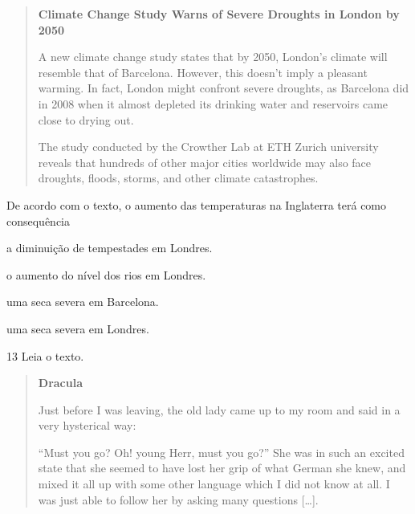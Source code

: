 \begin{quote}
\textbf{Climate Change Study Warns of Severe Droughts in London by 2050}

A new climate change study states that by 2050, London's climate will
resemble that of Barcelona. However, this doesn't imply a pleasant
warming. In fact, London might confront severe droughts, as Barcelona
did in 2008 when it almost depleted its drinking water and reservoirs
came close to drying out.

The study conducted by the Crowther Lab at ETH Zurich university reveals
that hundreds of other major cities worldwide may also face droughts,
floods, storms, and other climate catastrophes.

\end{quote}

De acordo com o texto, o aumento das temperaturas na Inglaterra terá
como consequência

\begin{escolha}
\item a diminuição de tempestades em Londres.

\item o aumento do nível dos rios em Londres.

\item uma seca severa em Barcelona.

\item uma seca severa em Londres.
\end{escolha}

\num{13} Leia o texto.

\begin{quote}
\textbf{Dracula}

Just before I was leaving, the old lady came up to my room and said in a
very hysterical way:

``Must you go? Oh! young Herr, must you go?'' She was in such an excited
state that she seemed to have lost her grip of what German she knew, and
mixed it all up with some other language which I did not know at all. I
was just able to follow her by asking many questions {[}\ldots{}{]}.

\end{quote}

